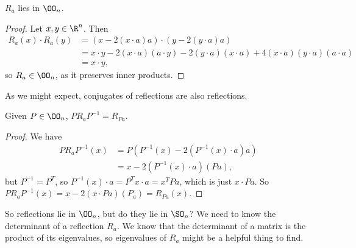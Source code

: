 \begin{definition}
\begin{center}

	\end{center}
\end{definition}

\begin{lemma}
	$R_a$ lies in $\OO_n$.
\end{lemma}
\begin{proof}
	Let $x, y \in \R^n$. Then
	\begin{align*}
		R_a(x) \cdot R_a(y) &= (x - 2(x \cdot a)a) \cdot (y - 2(y \cdot a)a) \\
		&= x \cdot y - 2(x \cdot a)(a \cdot y) - 2(y \cdot a)(x \cdot a) + 4(x \cdot a)(y \cdot a)(a \cdot a)\\
		&= x \cdot y,
	\end{align*}
	so $R_a \in \OO_n$, as it preserves inner products.
\end{proof}

As we might expect, conjugates of reflections are also reflections.

\begin{lemma}
	Given $P \in \OO_n$, $P R_a P^{-1} = R_{Pa}$.
\end{lemma}
\begin{proof}
	We have
	\begin{align*}
		P R_a P^{-1}(x) &= P(P^{-1}(x) - 2(P^{-1}(x) \cdot a)a) \\
		&= x - 2(P^{-1}(x) \cdot a)(P a),
	\end{align*}
	but $P^{-1} = P^T$, so $P^{-1}(x)\cdot a = P^T x \cdot a = x^T P a$, which is just $x \cdot Pa$. So $P R_a P^{-1}(x) = x - 2(x\cdot Pa)(P_a) = R_{Pa}(x)$.
\end{proof}


So reflections lie in $\OO_n$, but do they lie in $\SO_n$? We need to know the determinant of a reflection $R_a$. We know that the determinant of a matrix is the product of its eigenvalues, so eigenvalues of $R_a$ might be a helpful thing to find. 

